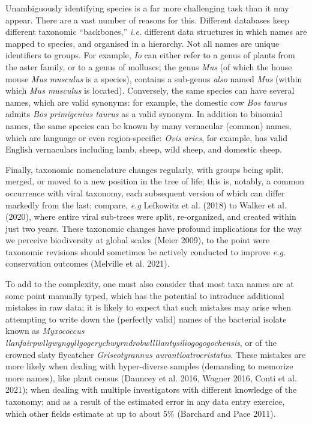 \documentclass[11pt]{article}
\begin{document}
\vfill

\clearpage
\linenumbers
\pagestyle{normal}

Unambiguously identifying species is a far more challenging task than it
may appear. There are a vast number of reasons for this. Different
databases keep different taxonomic ``backbones,'' \emph{i.e.} different
data structures in which names are mapped to species, and organised in a
hierarchy. Not all names are unique identifiers to groups. For example,
\emph{Io} can either refer to a genus of plants from the aster family,
or to a genus of molluscs; the genus \emph{Mus} (of which the house
mouse \emph{Mus musculus} is a species), contains a sub-genus
\emph{also} named \emph{Mus} (within which \emph{Mus musculus} is
located). Conversely, the same species can have several names, which are
valid synonyms: for example, the domestic cow \emph{Bos taurus} admits
\emph{Bos primigenius taurus} as a valid synonym. In addition to
binomial names, the same species can be known by many vernacular
(common) names, which are language or even region-specific: \emph{Ovis
aries}, for example, has valid English vernaculars including lamb,
sheep, wild sheep, and domestic sheep.

Finally, taxonomic nomenclature changes regularly, with groups being
split, merged, or moved to a new position in the tree of life; this is,
notably, a common occurrence with viral taxonomy, each subsequent
version of which can differ markedly from the last; compare, \emph{e.g}
Lefkowitz et al. (2018) to Walker et al. (2020), where entire viral
sub-trees were split, re-organized, and created within just two years.
These taxonomic changes have profound implications for the way we
perceive biodiversity at global scales (Meier 2009), to the point were
taxonomic revisions should sometimes be actively conducted to improve
\emph{e.g.} conservation outcomes (Melville et al. 2021).

To add to the complexity, one must also consider that most taxa names
are at some point manually typed, which has the potential to introduce
additional mistakes in raw data; it is likely to expect that such
mistakes may arise when attempting to write down the (perfectly valid)
names of the bacterial isolate known as \emph{Myxococcus
llanfairpwllgwyngyllgogerychwyrndrobwllllantysiliogogogochensis}, or of
the crowned slaty flycatcher \emph{Griseotyrannus
aurantioatrocristatus}. These mistakes are more likely when dealing with
hyper-diverse samples (demanding to memorize more names), like plant
census (Dauncey et al. 2016, Wagner 2016, Conti et al. 2021); when
dealing with multiple investigators with different knowledge of the
taxonomy; and as a result of the estimated error in any data entry
exercice, which other fields estimate at up to about 5\% (Barchard and
Pace 2011).
\end{document}
